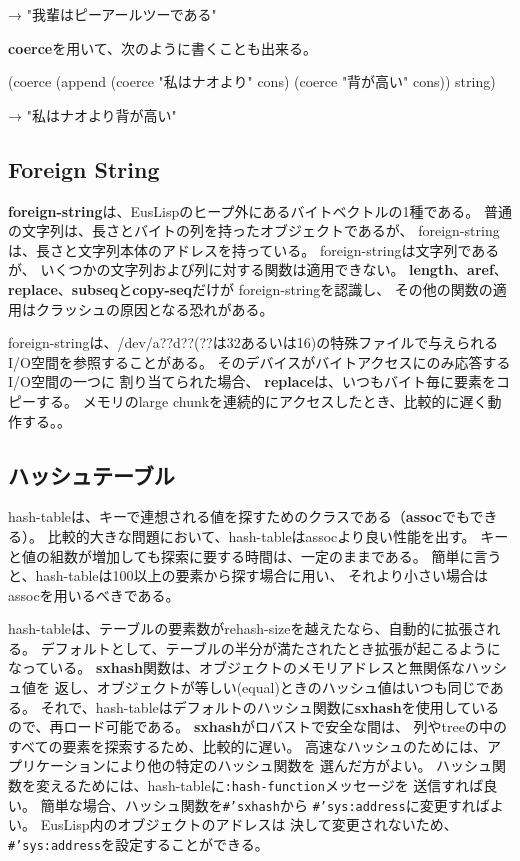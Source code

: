 → "我輩はピーアールツーである"

{\bf coerce}を用いて、次のように書くことも出来る。

(coerce (append (coerce "私はナオより" cons) (coerce "背が高い" cons)) string)

→ "私はナオより背が高い"

\subsection{Foreign String}
{\bf foreign-string}は、EusLispのヒープ外にあるバイトベクトルの1種である。
普通の文字列は、長さとバイトの列を持ったオブジェクトであるが、
foreign-stringは、長さと文字列本体のアドレスを持っている。
foreign-stringは文字列であるが、
いくつかの文字列および列に対する関数は適用できない。
{\bf length}、{\bf aref}、{\bf replace}、{\bf subseq}と{\bf copy-seq}だけが
foreign-stringを認識し、 
その他の関数の適用はクラッシュの原因となる恐れがある。

foreign-stringは、/dev/a??d??(??は32あるいは16)の特殊ファイルで与えられる
I/O空間を参照することがある。
そのデバイスがバイトアクセスにのみ応答するI/O空間の一つに
割り当てられた場合、
{\bf replace}は、いつもバイト毎に要素をコピーする。
メモリのlarge chunkを連続的にアクセスしたとき、比較的に遅く動作する。。

\begin{refdesc}

\end{refdesc}
\newpage

\subsection{ハッシュテーブル}

hash-tableは、キーで連想される値を探すためのクラスである（{\bf assoc}でもできる）。
比較的大きな問題において、hash-tableはassocより良い性能を出す。
キーと値の組数が増加しても探索に要する時間は、一定のままである。
簡単に言うと、hash-tableは100以上の要素から探す場合に用い、
それより小さい場合はassocを用いるべきである。

hash-tableは、テーブルの要素数がrehash-sizeを越えたなら、自動的に拡張される。
デフォルトとして、テーブルの半分が満たされたとき拡張が起こるようになっている。
{\bf sxhash}関数は、オブジェクトのメモリアドレスと無関係なハッシュ値を
返し、オブジェクトが等しい(equal)ときのハッシュ値はいつも同じである。
それで、hash-tableはデフォルトのハッシュ関数に{\bf sxhash}を使用している
ので、再ロード可能である。
{\bf sxhash}がロバストで安全な間は、
列やtreeの中のすべての要素を探索するため、比較的に遅い。
高速なハッシュのためには、アプリケーションにより他の特定のハッシュ関数を
選んだ方がよい。
ハッシュ関数を変えるためには、hash-tableに{\tt :hash-function}メッセージを
送信すれば良い。
簡単な場合、ハッシュ関数を{\tt \#'sxhash}から
{\tt \#'sys:address}に変更すればよい。
EusLisp内のオブジェクトのアドレスは
決して変更されないため、{\tt \#'sys:address}を設定することができる。

